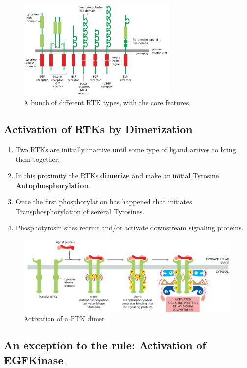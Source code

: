 \documentclass[../main.tex]{subfiles}
\begin{document}
\begin{figure}[H]
	\centering
	\includegraphics[width=0.7\textwidth]{RTk_types}
	\caption{A bunch of different RTK types, with the core features.}
\end{figure}

\subsection{Activation of RTKs by \gls{Dimerization}}

\begin{enumerate}
	\item Two RTKs are initially inactive until some type of ligand arrives to bring them together.
	\item In this proximity the RTKs \textbf{dimerize} and make an initial Tyrosine \textbf{\gls{Autophosphorylation}}.
	\item Once the first phosphorylation has happened that initiates \gls{Transphosphorylation} of several Tyrosines.
	\item \gls{Phosphotyrosin} sites recruit and/or activate downstream signaling proteins.
\end{enumerate}
\begin{figure}[H]
	\centering
	\includegraphics[height=0.3\textwidth]{RTk_act}
	\caption{Activation of a RTK dimer}
\end{figure}

\subsection{An exception to the rule: Activation of \gls{EGFKinase}}
\end{document}
